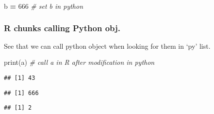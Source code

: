 \documentclass[
]{article}
\newenvironment{Shaded}{\begin{snugshade}}{\end{snugshade}}
\newcommand{\CommentTok}[1]{\textcolor[rgb]{0.56,0.35,0.01}{\textit{#1}}}
\newcommand{\DecValTok}[1]{\textcolor[rgb]{0.00,0.00,0.81}{#1}}
\newcommand{\FunctionTok}[1]{\textcolor[rgb]{0.00,0.00,0.00}{#1}}
\newcommand{\NormalTok}[1]{#1}
\newcommand{\OperatorTok}[1]{\textcolor[rgb]{0.81,0.36,0.00}{\textbf{#1}}}
\newcommand{\OtherTok}[1]{\textcolor[rgb]{0.56,0.35,0.01}{#1}}
\newcommand{\SpecialCharTok}[1]{\textcolor[rgb]{0.00,0.00,0.00}{#1}}
\newcommand{\StringTok}[1]{\textcolor[rgb]{0.31,0.60,0.02}{#1}}
\begin{document}
\begin{Shaded}
\begin{Highlighting}[]
\NormalTok{b }\OperatorTok{=} \DecValTok{666} \CommentTok{\# set b in python}
\end{Highlighting}
\end{Shaded}

\hypertarget{r-chunks-calling-python-obj.}{%
\subsubsection{R chunks calling Python
obj.}\label{r-chunks-calling-python-obj.}}

See that we can call python object when looking for them in `py' list.

\begin{Shaded}
\begin{Highlighting}[]
\FunctionTok{print}\NormalTok{(a) }\CommentTok{\# call a in R after modification in python}
\end{Highlighting}
\end{Shaded}

\begin{verbatim}
## [1] 43
\end{verbatim}

\begin{Shaded}
\end{Shaded}

\begin{verbatim}
## [1] 666
\end{verbatim}

\begin{Shaded}
\end{Shaded}

\begin{verbatim}
## [1] 2
\end{verbatim}
\end{document}
